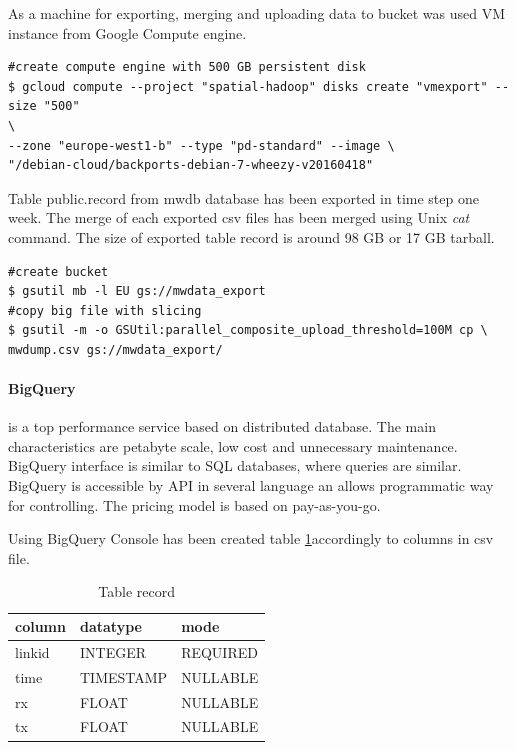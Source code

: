 \documentclass[a4paper,12pt,oneside]{report}
\begin{document}
		As a machine for exporting, merging and uploading data to bucket was used VM
		instance from Google Compute engine.
		
		\begin{footnotesize}
			\begin{lstlisting}[style=mybash]
#create compute engine with 500 GB persistent disk
$ gcloud compute --project "spatial-hadoop" disks create "vmexport" --size "500"
\
--zone "europe-west1-b" --type "pd-standard" --image \
"/debian-cloud/backports-debian-7-wheezy-v20160418"
			\end{lstlisting}
		\end{footnotesize}
		
		Table public.record from mwdb database has been exported in time step one week.
		The merge of each exported 
		csv files has been merged using Unix \textit{cat} command. The size of exported
		table record is around 98 GB or 17 GB tarball.
		
		
		\begin{footnotesize}
			\begin{lstlisting}[style=mybash]
#create bucket 
$ gsutil mb -l EU gs://mwdata_export
#copy big file with slicing
$ gsutil -m -o GSUtil:parallel_composite_upload_threshold=100M cp \
mwdump.csv gs://mwdata_export/
			\end{lstlisting}
		\end{footnotesize}
		
		\paragraph{BigQuery} is a top performance service based on distributed database. The main characteristics are petabyte scale, low cost and unnecessary maintenance. BigQuery interface is
		similar to SQL databases, where queries are similar. BigQuery is accessible by API in several language an allows programmatic way for controlling. The pricing model is based on 
		pay-as-you-go.
		
		Using BigQuery Console has been created table \ref{tab_rec}accordingly to columns in csv file. 
		
		\begin{table}[]
			\centering
			\caption{Table record}
			\label{tab_rec}
			\begin{tabular}{@{}|l|l|l|@{}}
				\toprule
				column & datatype  & mode     \\ \midrule
				linkid & INTEGER   & REQUIRED \\ \midrule
				time   & TIMESTAMP & NULLABLE \\ \midrule
				rx     & FLOAT     & NULLABLE \\ \midrule
				tx     & FLOAT     & NULLABLE \\ \bottomrule
			\end{tabular}
		\end{table}
		
\end{document}

